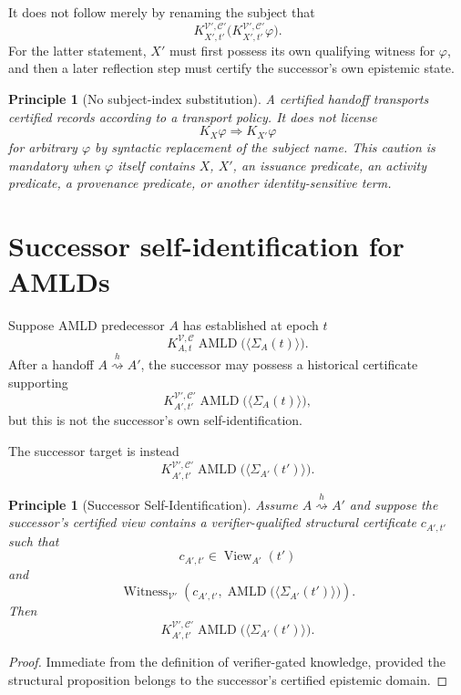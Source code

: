 \documentclass[11pt]{article}
\newtheorem{principle}[definition]{Principle}
\theoremstyle{remark}
\newcommand{\View}{\operatorname{View}}
\newcommand{\Witness}{\operatorname{Witness}}
\newcommand{\AMLD}{\operatorname{AMLD}}
\newcommand{\K}[4]{K^{#3,#4}_{#1,#2}}
\newcommand{\handoff}{\mathrel{\overset{h}{\rightsquigarrow}}}
\begin{document}
It does not follow merely by renaming the subject that
\[
\K{X'}{t'}{\mathcal V'}{\mathcal C'}
\bigl(\K{X'}{t'}{\mathcal V'}{\mathcal C'}\varphi\bigr).
\]
For the latter statement, $X'$ must first possess its own qualifying witness for $\varphi$, and then a later reflection step must certify the successor's own epistemic state.

\begin{principle}[No subject-index substitution]
A certified handoff transports certified records according to a transport policy. It does not license
\[
K_X\varphi\Longrightarrow K_{X'}\varphi
\]
for arbitrary $\varphi$ by syntactic replacement of the subject name. This caution is mandatory when $\varphi$ itself contains $X$, $X'$, an issuance predicate, an activity predicate, a provenance predicate, or another identity-sensitive term.
\end{principle}

\section{Successor self-identification for AMLDs}

Suppose AMLD predecessor $A$ has established at epoch $t$
\[
\K{A}{t}{\mathcal V}{\mathcal C}
\AMLD\bigl(\langle\Sigma_A(t)\rangle\bigr).
\]
After a handoff $A\handoff A'$, the successor may possess a historical certificate supporting
\[
\K{A'}{t'}{\mathcal V'}{\mathcal C'}
\AMLD\bigl(\langle\Sigma_A(t)\rangle\bigr),
\]
but this is not the successor's own self-identification.

The successor target is instead
\[
\K{A'}{t'}{\mathcal V'}{\mathcal C'}
\AMLD\bigl(\langle\Sigma_{A'}(t')\rangle\bigr).
\]

\begin{principle}[Successor Self-Identification]
Assume $A\handoff A'$ and suppose the successor's certified view contains a verifier-qualified structural certificate $c_{A',t'}$ such that
\[
c_{A',t'}\in\View_{A'}(t')
\]
and
\[
\Witness_{\mathcal V'}\!\left(c_{A',t'},
\AMLD\bigl(\langle\Sigma_{A'}(t')\rangle\bigr)\right).
\]
Then
\[
\K{A'}{t'}{\mathcal V'}{\mathcal C'}
\AMLD\bigl(\langle\Sigma_{A'}(t')\rangle\bigr).
\]
\end{principle}
\begin{proof}
Immediate from the definition of verifier-gated knowledge, provided the structural proposition belongs to the successor's certified epistemic domain.
\end{proof}
\end{document}
